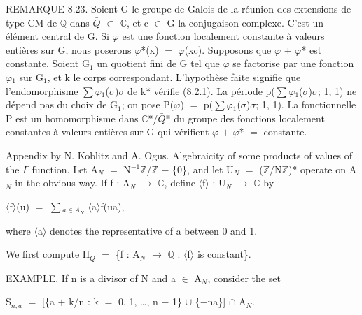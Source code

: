 \documentclass[10pt,twoside]{article}
\begin{document}
REMARQUE 8.23. Soient G le groupe de Galois de la réunion des extensions de type CM de \ensuremath{ℚ} dans \ensuremath{\bar{Q}} \ensuremath{⊂} \ensuremath{ℂ}, et c \ensuremath{∈} G la conjugaison complexe. C’est un élément central de G. Si \ensuremath{φ} est une fonction localement constante à valeurs entières sur G, nous poserons \ensuremath{φ}*(x) \ensuremath{=} \ensuremath{φ}(xc). Supposons que \ensuremath{φ} \ensuremath{+} \ensuremath{φ}* est constante. Soient G\ensuremath{_{1}} un quotient fini de G tel que \ensuremath{φ} se factorise par une fonction \ensuremath{φ}\ensuremath{_{1}} sur G\ensuremath{_{1}}, et k le corps correspondant. L’hypothèse faite signifie que l’endomorphisme \ensuremath{∑}\ensuremath{φ}\ensuremath{_{1}}(\ensuremath{σ})\ensuremath{σ} de k* vérifie (8.2.1). La période p(\ensuremath{∑}\ensuremath{φ}\ensuremath{_{1}}(\ensuremath{σ})\ensuremath{σ}; 1, 1) ne dépend pas du choix de G\ensuremath{_{1}}; on pose P(\ensuremath{φ}) \ensuremath{=} p(\ensuremath{∑}\ensuremath{φ}\ensuremath{_{1}}(\ensuremath{σ})\ensuremath{σ}; 1, 1). La fonctionnelle P est un homomorphisme dans \ensuremath{ℂ}*/\ensuremath{\bar{Q}}* du groupe des fonctions localement constantes à valeurs entières sur G qui vérifient \ensuremath{φ} \ensuremath{+} \ensuremath{φ}* \ensuremath{=} constante.\par
Appendix by N. Koblitz and A. Ogus. Algebraicity of some products of values of the \ensuremath{Γ} function. Let A\ensuremath{_{N}} \ensuremath{=} N\ensuremath{^{-1}}\ensuremath{ℤ}/\ensuremath{ℤ} \ensuremath{−} \{0\}, and let U\ensuremath{_{N}} \ensuremath{=} (\ensuremath{ℤ}/N\ensuremath{ℤ})* operate on A\ensuremath{_{N}} in the obvious way. If f : A\ensuremath{_{N}} \ensuremath{→} \ensuremath{ℂ}, define \ensuremath{⟨}f\ensuremath{⟩} : U\ensuremath{_{N}} \ensuremath{→} \ensuremath{ℂ} by\par
\ensuremath{⟨}f\ensuremath{⟩}(u) \ensuremath{=} \ensuremath{∑}\ensuremath{_{a∈A_N}} \ensuremath{⟨}a\ensuremath{⟩}f(ua),\par
where \ensuremath{⟨}a\ensuremath{⟩} denotes the representative of a between 0 and 1.\par
We first compute H\ensuremath{_{Q}} \ensuremath{=} \{f : A\ensuremath{_{N}} \ensuremath{→} \ensuremath{ℚ} : \ensuremath{⟨}f\ensuremath{⟩} is constant\}.\par
EXAMPLE. If n is a divisor of N and a \ensuremath{∈} A\ensuremath{_{N}}, consider the set\par
S\ensuremath{_{n,a}} \ensuremath{=} [\{a \ensuremath{+} k/n : k \ensuremath{=} 0, 1, …, n \ensuremath{−} 1\} \ensuremath{∪} \{\ensuremath{−}na\}] \ensuremath{∩} A\ensuremath{_{N}}.\par
\end{document}
